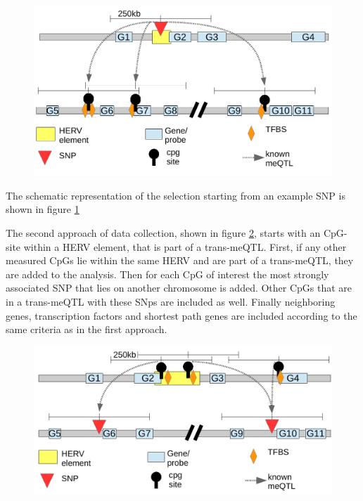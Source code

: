 \documentclass[a4paper,12pt,twoside,openright]{report}
\begin{document}
\begin{figure}[b!]
	\includegraphics[scale=0.86, keepaspectratio = true]{../figures/ggm_data_collect_snp_scheme}
	\caption{}
	\label{fig:ggm.data.collect.snp.scheme}
\end{figure}

The schematic representation of the selection starting from an example SNP is shown in figure \ref{fig:ggm.data.collect.snp.scheme}

The second approach of data collection, shown in figure \ref{fig:ggm.data.collect.cpg.scheme}, starts with an CpG-site within a HERV element, that is part of a trans-meQTL. First, if any other measured CpGs lie within the same HERV and are part of a trans-meQTL, they are added to the analysis. Then for each CpG of interest the most strongly associated SNP that lies on another chromosome is added. Other CpGs that are in a trans-meQTL with these SNps are included as well. Finally neighboring genes, transcription factors and shortest path genes are included according to the same criteria as in the first approach.

\begin{figure}[b!]
	\includegraphics[scale=0.86, keepaspectratio = true]{../figures/ggm_data_collect_cpg_scheme}
	\caption{}
	\label{fig:ggm.data.collect.cpg.scheme}
\end{figure}
\end{document}
